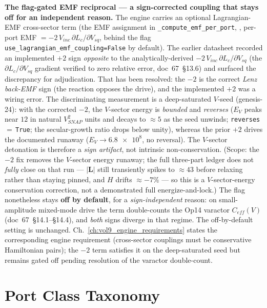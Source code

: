 \noindent\textbf{The flag-gated EMF reciprocal --- a sign-corrected coupling that stays off for an independent reason.} The engine carries an optional Lagrangian-EMF cross-sector term (the EMF assignment in \texttt{\_compute\_emf\_per\_port}, , per-port EMF $= -2\,V_{inc}\,\partial L_c/\partial V_{sq}$, behind the flag \texttt{use\_lagrangian\_emf\_coupling=False} by default). The earlier datasheet recorded an implemented $+2$ sign \emph{opposite} to the analytically-derived $-2\,V_{inc}\,\partial L_c/\partial V_{sq}$ (the $\partial L_c/\partial V_{sq}$ gradient verified to zero relative error, doc~67~\S13.6) and surfaced the discrepancy for adjudication. That has been resolved: the $-2$ is the correct \emph{Lenz back-EMF} sign (the reaction opposes the drive), and the implemented $+2$ was a wiring error. The discriminating measurement is a deep-saturated $V$-seed (genesis-24): with the corrected $-2$, the $V$-sector energy is \emph{bounded} and \emph{reverses} ($E_V$ peaks near $12$ in natural $V_{SNAP}^2$ units and decays to $\approx 5$ as the seed unwinds; \texttt{reverses}\,$=$\,\texttt{True}; the secular-growth ratio drops below unity), whereas the prior $+2$ drives the documented runaway ($E_V \to \num{6.8e8}$, no reversal). The $V$-sector detonation is therefore a \emph{sign artifact}, not intrinsic non-conservation. (Scope: the $-2$ fix removes the $V$-sector energy runaway; the full three-part ledger does not \emph{fully} close on that run --- $|\mathbf{L}|$ still transiently spikes to $\approx 43$ before relaxing rather than staying pinned, and $H$ drifts $\approx -7\%$ --- so this is a $V$-sector-energy conservation correction, not a demonstrated full energize-and-lock.) The flag nonetheless stays \textbf{off by default}, for a \emph{sign-independent} reason: on small-amplitude mixed-mode drive the term double-counts the Op14 varactor $C_{eff}(V)$ (doc~67~\S14.1--\S14.4), and \emph{both} signs diverge in that regime. The off-by-default setting is unchanged. Ch.~\ref{ch:vol9_engine_requirements} states the corresponding engine requirement (cross-sector couplings must be conservative Hamiltonian pairs); the $-2$ term satisfies it on the deep-saturated seed but remains gated off pending resolution of the varactor double-count.

\section{Port Class Taxonomy}
\label{sec:vol9_port_class_taxonomy}

